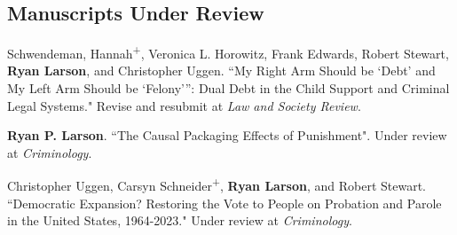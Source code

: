 \documentclass[letterpaper]{article}
\renewenvironment{itemize}{
  \begin{list}{}{
    \setlength{\leftmargin}{1.5em}
  }
}{
  \end{list}
}
\begin{document}
\subsection*{Manuscripts Under Review}
\begin{itemize}

\item Schwendeman, Hannah\textsuperscript{+}, Veronica L. Horowitz, Frank Edwards, Robert Stewart, \textbf{Ryan Larson}, and Christopher Uggen. ``My Right Arm Should be ‘Debt’ and My Left Arm Should be ‘Felony’”: Dual Debt in the Child Support and Criminal Legal Systems." Revise and resubmit at \textit{Law and Society Review}. 


\item \textbf{Ryan P. Larson}. ``The Causal Packaging Effects of Punishment". Under review at \textit{Criminology}.

\item Christopher Uggen, Carsyn Schneider\textsuperscript{+}, \textbf{Ryan Larson}, and Robert Stewart. ``Democratic Expansion? Restoring the Vote to People on Probation and Parole in the United States, 1964-2023." Under review at \textit{Criminology}.


\end{itemize}
\end{document}
